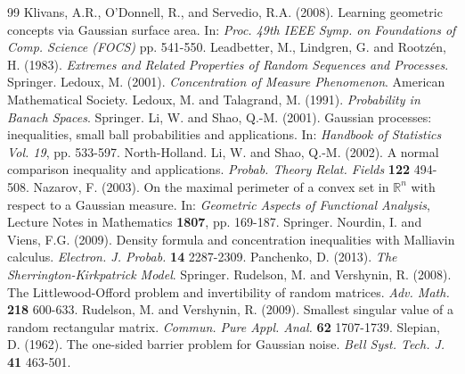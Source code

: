 \documentclass[11pt,reqno]{amsart}
\theoremstyle{definition}
\newcommand{\RR}{\mathbb{R}}
\begin{document}
\begin{thebibliography}{99}
Klivans, A.R., O'Donnell, R., and Servedio, R.A. (2008). Learning geometric concepts via Gaussian surface area. In: {\em Proc. 49th IEEE Symp. on Foundations of Comp. Science (FOCS)}  pp. 541-550.
Leadbetter, M., Lindgren, G. and Rootz\'{e}n, H.  (1983). {\em Extremes and Related Properties of Random Sequences and Processes}. Springer.
Ledoux, M. (2001). {\em Concentration of Measure Phenomenon}. American Mathematical Society.
Ledoux, M. and Talagrand, M. (1991). {\em Probability in Banach Spaces}. Springer.
Li, W. and Shao, Q.-M. (2001). Gaussian processes: inequalities, small ball probabilities and applications. In: {\em Handbook of Statistics Vol. 19},  pp. 533-597. North-Holland.
Li, W. and Shao, Q.-M. (2002). A normal comparison inequality and applications. {\em Probab. Theory Relat. Fields} \textbf{122} 494-508.
Nazarov, F. (2003). On the maximal perimeter of a convex set in $\RR^n$ with respect to a Gaussian measure. In: {\em Geometric Aspects of Functional Analysis}, Lecture Notes in Mathematics \textbf{1807}, pp. 169-187. Springer.
Nourdin, I. and Viens, F.G. (2009). Density formula and concentration inequalities with Malliavin calculus. {\em Electron. J. Probab.} \textbf{14} 2287-2309.
Panchenko, D. (2013). {\em The Sherrington-Kirkpatrick Model}. Springer.
Rudelson, M. and Vershynin, R. (2008).  The Littlewood-Offord problem and invertibility of random matrices. {\em Adv. Math.}  \textbf{218} 600-633.
Rudelson, M. and Vershynin, R. (2009). Smallest singular value of a random rectangular matrix. {\em Commun. Pure Appl. Anal.} \textbf{62} 1707-1739.
Slepian, D. (1962). The one-sided barrier problem for Gaussian noise. {\em Bell Syst. Tech. J.} \textbf{41} 463-501.

\end{thebibliography}
\end{document}
